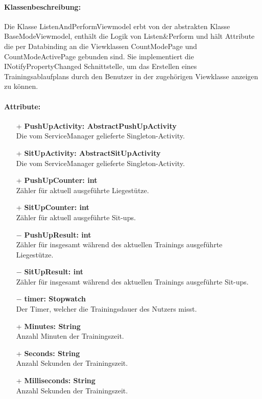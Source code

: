 \documentclass[a4paper,12pt]{article}
\begin{document}
\paragraph{Klassenbeschreibung:}
Die Klasse ListenAndPerformViewmodel erbt von der abstrakten Klasse BaseModeViewmodel, enthält die Logik von Listen\&Perform und hält Attribute die per Databinding an die Viewklassen CountModePage und CountModeActivePage gebunden sind.  Sie implementiert die INotifyPropertyChanged Schnittstelle, um das Erstellen eines Trainingsablaufplans durch den Benutzer in der zugehörigen Viewklasse anzeigen zu können.
\paragraph{Attribute:}
\begin{itemize}
	\item[+] \textbf{PushUpActivity: AbstractPushUpActivity} \\ Die vom ServiceManager gelieferte Singleton-Activity.
	\item[+] \textbf{SitUpActivity: AbstractSitUpActivity} \\ Die vom ServiceManager gelieferte Singleton-Activity.
	\item[+] \textbf{PushUpCounter: int} \\ Zähler für aktuell ausgeführte Liegestütze. 
	\item[+] \textbf{SitUpCounter: int} \\ Zähler für aktuell ausgeführte Sit-ups. 
	\item[$-$] \textbf{PushUpResult: int} \\ Zähler für insgesamt während des aktuellen Trainings ausgeführte Liegestütze. 
	\item[$-$] \textbf{SitUpResult: int} \\ Zähler für insgesamt während des aktuellen Trainings ausgeführte Sit-ups. 
	\item[$-$] \textbf{timer: Stopwatch} \\ Der Timer, welcher die Trainingsdauer des Nutzers misst. 
	\item[+] \textbf{Minutes: String} \\ Anzahl Minuten der Trainingszeit. 
	\item[+] \textbf{Seconds: String} \\  Anzahl Sekunden der Trainingszeit. 
	\item[+] \textbf{Milliseconds: String} \\ Anzahl Sekunden der Trainingszeit. 

\end{itemize}
\end{document}
